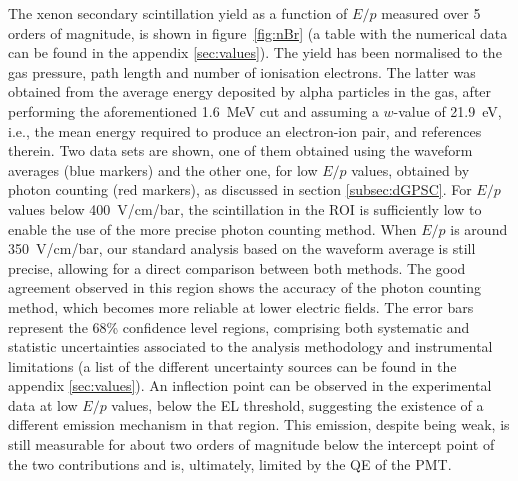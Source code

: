 \documentclass[%
 reprint,
superscriptaddress,
 amsmath,amssymb,
 aps,
]{revtex4-2}
\begin{document}
The xenon secondary scintillation yield as a function of $E/p$ measured over 5 orders of magnitude, is shown in figure~\ref{fig:nBr} (a table with the numerical data can be found in the appendix \ref{sec:values}). The yield has been normalised to the gas pressure, path length and number of ionisation electrons. The latter was obtained from the average energy deposited by alpha particles in the gas, after performing the aforementioned 1.6~MeV cut and assuming a $w$-value of 21.9~eV, i.e., the mean energy required to produce an electron-ion pair, \cite{carmo} and references therein. Two data sets are shown, one of them obtained using the waveform averages (blue markers) and the other one, for low $E/p$ values, obtained by photon counting (red markers), as discussed in section \ref{subsec:dGPSC}. For $E/p$ values below 400~V/cm/bar, the scintillation in the ROI is sufficiently low to enable the use of the more precise photon counting method. When $E/p$ is around 350~V/cm/bar, our standard analysis based on the waveform average is still precise, allowing for a direct comparison between both methods. 
The good agreement observed in this region shows the accuracy of the photon counting method, which becomes more reliable at lower electric fields.
The error bars represent the 68\% confidence level regions, comprising both systematic and statistic uncertainties associated to the analysis methodology and instrumental limitations (a list of the different uncertainty sources can be found in the appendix \ref{sec:values}). An inflection point can be observed in the experimental data at low $E/p$ values, below the EL threshold, suggesting the existence of a different emission mechanism in that region. This emission, despite being weak, is still measurable for about two orders of magnitude below the intercept point of the two contributions and is, ultimately, limited by the QE of the PMT.
\end{document}
